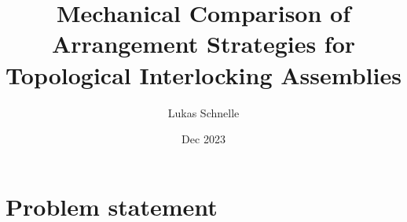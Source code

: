 \documentclass{beamer}
\title{Mechanical Comparison of Arrangement Strategies for Topological Interlocking Assemblies}
\author{Lukas Schnelle}
\date{Dec 2023}
\numberwithin{equation}{aufgabe}
\newcommand\R{\mathbb R}
\begin{document}
\maketitle

\section{Problem statement}
\cite[Thm. 1]{bridges23}


\newpage
\printbibliography 
\end{document}
